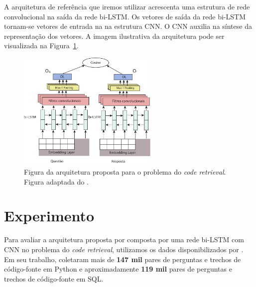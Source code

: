 \documentclass[12pt]{article}
\begin{document}
A arquitetura de referência que iremos utilizar acrescenta uma estrutura de rede convolucional na saída da rede bi-LSTM. Os vetores de saída da rede bi-LSTM tornam-se vetores de entrada na na estrutura CNN. O CNN auxilia na síntese da representação dos vetores. A imagem ilustrativa da arquitetura pode ser visualizada na Figura~\ref{fig:arquitetura-bi-lstm}.


\begin{figure}[h]
    \centering
    \includegraphics[width=0.6\textwidth]{figures/ArquiteturaBiLSTM.pdf}
    \caption{Figura da arquitetura proposta para o problema do \textit{code retrieval}. Figura adaptada do \cite{tan-lstm-qa}.}
    \label{fig:arquitetura-bi-lstm}
\end{figure}





\section{Experimento}\label{sec:experimento}

Para avaliar a arquitetura proposta por \cite{tan-lstm-qa} composta por uma rede bi-LSTM com CNN no problema do \textit{code retrieval}, utilizamos os dados disponibilizados por \cite{Yao-staqc:2018}. Em seu trabalho, \cite{Yao-staqc:2018} coletaram mais de \textbf{147 mil} pares de perguntas e trechos de código-fonte em Python e aproximadamente \textbf{119 mil} pares de perguntas e trechos de código-fonte em SQL. 
\end{document}
